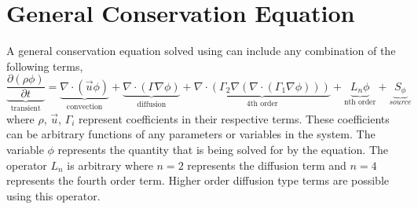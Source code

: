 \section{General Conservation Equation}

A general conservation equation solved using \FiPy{} can include any
combination of the following terms,
\begin{equation}
  \underbrace{
    \frac{\partial (\rho \phi)}{\partial t}
  }_{\text{transient}}
=
\underbrace{
  \nabla \cdot \left( \vec{u} \phi \right)
}_{\text{convection}}
+
\underbrace{
  \nabla \cdot \left( \Gamma \nabla \phi \right) 
}_{\text{diffusion}}
+
\underbrace{
  \nabla \cdot \left( \Gamma_2 \nabla 
    \left( \nabla \cdot \left( \Gamma_1 \nabla \phi \right) \right) \right)
}_{\text{4th order}}
+
\underbrace{
  L_n \phi
}_{\text{nth order}}
+
\underbrace{
  S_{\phi}
}_{source}
\label{eqn:num:gen}
\end{equation}
where $\rho$, $\vec{u}$, $\Gamma_i$ represent coefficients in their
respective terms. These coefficients can be arbitrary functions of any
parameters or variables in the system. The variable $\phi$ represents
the quantity that is being solved for by the equation. The operator
$L_n$ is arbitrary where $n=2$ represents the diffusion term and $n=4$
represents the fourth order term. Higher order diffusion type terms
are possible using this operator.



